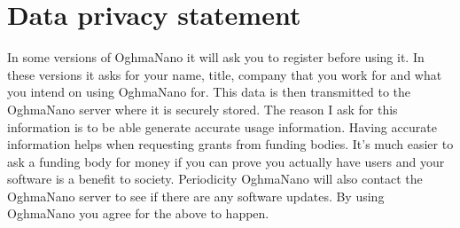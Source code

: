 \newpage
\section{Data privacy statement}
In some versions of OghmaNano it will ask you to register before using it.  In these versions it asks for your name, title, company that you work for and what you intend on using OghmaNano for.  This data is then transmitted to the OghmaNano server where it is securely stored. The reason I ask for this information is to be able generate accurate usage information. Having accurate information helps when requesting grants from funding bodies.  It's much easier to ask a funding body for money if you can prove you actually have users and your software is a benefit to society. Periodicity OghmaNano will also contact the OghmaNano server to see if there are any software updates. By using OghmaNano you agree for the above to happen.
